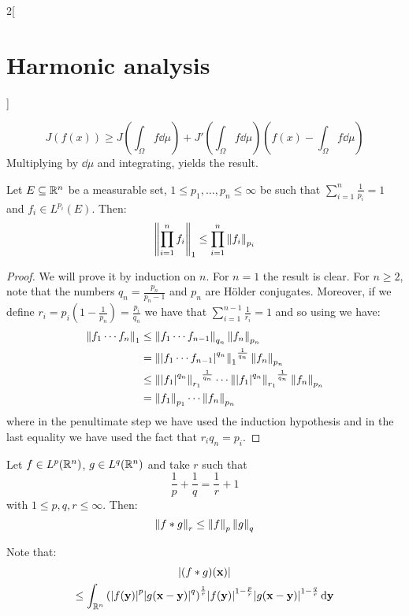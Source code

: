 \documentclass[../../../main_math.tex]{subfiles}
\begin{document}
\begin{multicols}{2}[\section{Harmonic analysis}]
\begin{sproof}
    $$J(f(x))\geq J\left(\int_\Omega f\dd{\mu}\right)+J'\left(\int_\Omega f\dd{\mu}\right)\!\!\left(f(x)-\int_\Omega f\dd{\mu}\right)$$
    Multiplying by $\dd{\mu}$ and integrating, yields the result.
  \end{sproof}
  \begin{lemma}\label{HA:holderGeneralized}
    Let $E\subseteq\mathbb{R}^n$ be a measurable set, $1\leq p_1,\ldots,p_n\leq \infty$ be such that $\sum_{i=1}^n\frac{1}{p_i}=1$ and ${f_i}\in L^{p_i}(E)$. Then:
    $$\left\|\prod_{i=1}^{n}f_i\right\|_1\leq\prod_{i=1}^{n}\left\|{f_i}\right\|_{p_i}$$
  \end{lemma}
  \begin{proof}
    We will prove it by induction on $n$. For $n=1$ the result is clear. For $n\geq 2$, note that the numbers $q_n=\frac{p_n}{p_n-1}$ and $p_n$ are Hölder conjugates. Moreover, if we define $r_i=p_i\left(1-\frac{1}{p_n}\right)=\frac{p_i}{q_n}$ we have that $\sum_{i=1}^{n-1}\frac{1}{r_i}=1$ and so using  we have:
    \begin{align*}
      \left\|{f_1\cdots f_n}\right\|_1 & \leq \left\|{f_1\cdots f_{n-1}}\right\|_{q_n}\left\|f_n\right\|_{p_n}                                                                    \\
                               & = {\left\|\abs{f_1\cdots f_{n-1}}^{q_n}\right\|_{1}}^{\frac{1}{q_n}}\left\|f_n\right\|_{p_n}                                             \\
                               & \leq {\left\|\abs{f_1}^{q_n}\right\|_{r_1}}^{\frac{1}{q_n}}\cdots {\left\|\abs{f_1}^{q_n}\right\|_{r_1}}^{\frac{1}{q_n}}\left\|f_n\right\|_{p_n} \\
                               & =\left\|f_1\right\|_{p_1}\cdots\left\|f_n\right\|_{p_n}
    \end{align*}
    where in the penultimate step we have used the induction hypothesis and in the last equality we have used the fact that $r_iq_n=p_i$.
  \end{proof}
  \begin{lemma}\label{HA:youngConvolution}
    Let $f\in L^p(\mathbb{R}^n)$, $g\in L^q(\mathbb{R}^n)$ and take $r$ such that $$\frac{1}{p}+\frac{1}{q}=\frac{1}{r}+1$$ with $1\leq p,q,r\leq \infty$. Then: $$\left\|f*g\right\|_r\leq\left\|f\right\|_p\left\|g\right\|_q$$
  \end{lemma}
  \begin{sproof}
    Note that:
    \begin{multline*}
      \abs{(f*g)(\vf{x})} \\
      \leq\int_{\RR^n}{\left(\abs{f(\vf{y})}^{p}\abs{g(\vf{x}-\vf{y})}^{q}\right)}^\frac{1}{r}\abs{f(\vf{y})}^{1-\frac{p}{r}}\abs{g(\vf{x}-\vf{y})}^{1-\frac{q}{r}}\dd{\vf{y}}    \\

\end{multline*}
\end{sproof}
\end{multicols}
\end{document}
